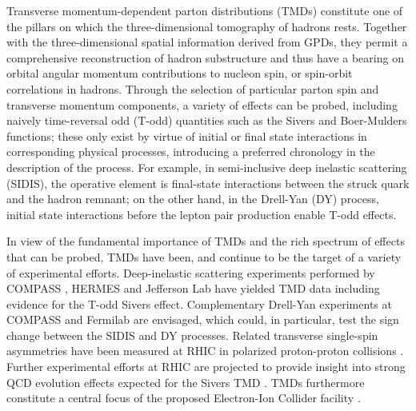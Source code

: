 Transverse momentum-dependent parton distributions (TMDs) \cite{Boer:2011fh}
constitute one of the pillars on which the three-dimensional tomography of
hadrons rests. Together with the three-dimensional spatial information
derived from GPDs, they permit a
comprehensive reconstruction of hadron substructure and thus
have a bearing on %
orbital angular momentum contributions to nucleon spin, or
spin-orbit correlations in hadrons. Through the selection of
particular parton spin and transverse momentum components, a
variety of effects can be probed, including naively time-reversal odd
(T-odd) quantities such as the Sivers and Boer-Mulders functions;
these only exist by virtue of initial or final state interactions
in corresponding physical processes, introducing a preferred chronology
in the description of the process.
For example, in semi-inclusive
deep inelastic scattering (SIDIS), the operative element is final-state
interactions between the struck quark and the hadron remnant; on
the other hand, in the Drell-Yan (DY) process, initial state interactions
before the lepton pair production enable T-odd effects.

In view of the fundamental importance of TMDs and the rich spectrum of
effects that can be probed, TMDs have been, and continue to be the
target of a variety of experimental efforts. Deep-inelastic scattering
experiments performed by COMPASS \cite{Alekseev:2008aa,Adolph:2014fjw},
HERMES \cite{Airapetian:2009ae,Airapetian:2013bim} and Jefferson Lab
\cite{Qian:2011py,Avakian:2010ae} have yielded TMD data including evidence
for the T-odd Sivers effect. Complementary Drell-Yan experiments at
COMPASS \cite{Gautheron:2010wva} and Fermilab \cite{Brown:2014sea} are
envisaged, which could, in particular, test the sign change between
the SIDIS and DY processes. Related transverse single-spin
asymmetries have been measured at RHIC in polarized proton-proton
collisions \cite{Adare:2013ekj,Adamczyk:2012xd}. Further experimental
efforts at RHIC are projected to provide insight into strong QCD evolution
effects expected for the Sivers TMD \cite{Echevarria:2014vda}.
TMDs furthermore constitute a central focus of the proposed Electron-Ion
Collider facility \cite{Accardi:2012qut}.

